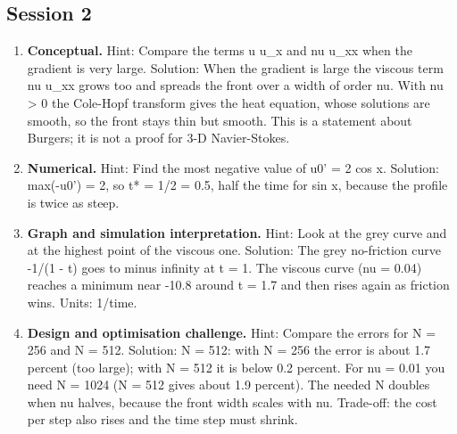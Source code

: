 \documentclass[11pt,a4paper]{article}
\begin{document}
\subsection*{Session 2}
\begin{enumerate}[nosep]
\item \textbf{Conceptual.} Hint: Compare the terms u u\_x and nu u\_xx when the gradient is very large. Solution: When the gradient is large the viscous term nu u\_xx grows too and spreads the front over a width of order nu. With nu \textgreater{} 0 the Cole-Hopf transform gives the heat equation, whose solutions are smooth, so the front stays thin but smooth. This is a statement about Burgers; it is not a proof for 3-D Navier-Stokes.
\item \textbf{Numerical.} Hint: Find the most negative value of u0' = 2 cos x. Solution: max(-u0') = 2, so t* = 1/2 = 0.5, half the time for sin x, because the profile is twice as steep.
\item \textbf{Graph and simulation interpretation.} Hint: Look at the grey curve and at the highest point of the viscous one. Solution: The grey no-friction curve -1/(1 - t) goes to minus infinity at t = 1. The viscous curve (nu = 0.04) reaches a minimum near -10.8 around t = 1.7 and then rises again as friction wins. Units: 1/time.
\item \textbf{Design and optimisation challenge.} Hint: Compare the errors for N = 256 and N = 512. Solution: N = 512: with N = 256 the error is about 1.7 percent (too large); with N = 512 it is below 0.2 percent. For nu = 0.01 you need N = 1024 (N = 512 gives about 1.9 percent). The needed N doubles when nu halves, because the front width scales with nu. Trade-off: the cost per step also rises and the time step must shrink.
\end{enumerate}
\end{document}
